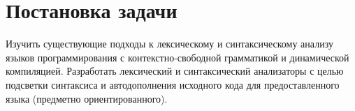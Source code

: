 \chapter{Постановка задачи} \label{chapt2}

Изучить существующие подходы к лексическому и синтаксическому анализу языков программирования с контекстно-свободной грамматикой и динамической компиляцией. Разработать лексический и синтаксический анализаторы с целью подсветки синтаксиса и автодополнения исходного кода для предоставленного языка (предметно ориентированного).